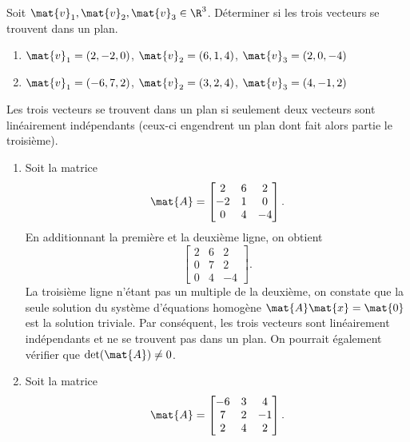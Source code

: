 \begin{exercice}
  Soit $\mat{v}_1, \mat{v}_2, \mat{v}_3 \in \R^3$. Déterminer si
  les trois vecteurs se trouvent dans un plan.
  \begin{enumerate}
  \item $\mat{v}_1 = ( 2, -2,  0)$,
        $\mat{v}_2 = ( 6,  1,  4)$,
        $\mat{v}_3 = ( 2,  0, -4)$
  \item $\mat{v}_1 = (-6,  7,  2)$,
        $\mat{v}_2 = ( 3,  2,  4)$,
        $\mat{v}_3 = ( 4, -1,  2)$
  \end{enumerate}
  \begin{sol}
    Les trois vecteurs se trouvent dans un plan si seulement deux
    vecteurs sont linéairement indépendants (ceux-ci engendrent un
    plan dont fait alors partie le troisième).
    \begin{enumerate}
    \item Soit la matrice
      \begin{displaymath}
        \mat{A} =
        \begin{bmatrix}
          2 & 6 & 2 \\ -2 & 1 & 0 \\ 0 & 4 & -4
        \end{bmatrix}.
      \end{displaymath}
      En additionnant la première et la deuxième ligne, on obtient
      \begin{displaymath}
        \begin{bmatrix}
          2 & 6 & 2 \\ 0 & 7 & 2 \\ 0 & 4 & -4
        \end{bmatrix}.
      \end{displaymath}
      La troisième ligne n'étant pas un multiple de la deuxième, on
      cons\-tate que la seule solution du système d'équations homogène
      $\mat{A} \mat{x} = \mat{0}$ est la solution triviale. Par
      conséquent, les trois vecteurs sont linéairement indépendants et
      ne se trouvent pas dans un plan. On pourrait également vérifier
      que $\det(\mat{A}) \neq 0$.
    \item Soit la matrice
      \begin{displaymath}
        \mat{A} =
        \begin{bmatrix}
          -6 & 3 & 4 \\ 7 & 2 & -1 \\ 2 & 4 & 2
        \end{bmatrix}.
      \end{displaymath}

\end{enumerate}
\end{sol}
\end{exercice}
